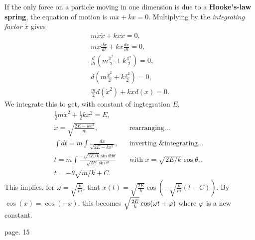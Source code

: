 \begin{remark}
    If the only force on a particle moving in one dimension is due to a \textbf{Hooke's-law spring}, the equation of motion is $m\ddot{x} + kx = 0$. Multiplying by the \emph{integrating factor} $\dot{x}$ gives 
    \begin{align*}
        m\dot{x}\ddot{x} + kx\dot{x} = 0, \\
        m\dot{x}\frac{d\dot{x}}{dt} + kx\frac{dx}{dt} = 0, \\
        \frac{d}{dt}(m\frac{\dot{x}^2}{2} + k\frac{x^2}{2}) = 0, \\
        d(m\frac{\dot{x}^2}{2} + k\frac{x^2}{2}) = 0, \\
        \frac{m}{2}d(\dot{x}^2) + kxd(x) = 0.
    \end{align*}
    We integrate this to get, with constant of ingtegration $E$,
    \begin{align*}
        \frac{1}{2}m\dot{x}^2 + \frac{1}{2}kx^2 = E, \\
        \dot{x} = \sqrt{\frac{2E - kx^2}{m}}, && \text{rearranging...} \\
        \int dt = m \int\frac{dx}{\sqrt{2E - kx^2}}, && \text{inverting \& integrating... } \\
        t = m \int\frac{-\sqrt{2E/k}\sin\theta d\theta}{\sqrt{2E}\sin\theta} && \text{with } x = \sqrt{2E/k}\cos\theta \text{...} \\
        t = -\theta\sqrt{m/k} + C.
    \end{align*}
    This implies, for $\omega = \sqrt{\frac{k}{m}}$, that $x(t) = \sqrt{\frac{2E}{k}}\cos(-\sqrt{\frac{k}{m}}(t-C))$. By $\cos(x) = \cos(-x)$, this becomes $\sqrt{\frac{2E}{k}}\cos(\omega t + \varphi)$ where $\varphi$ is a new constant.
\end{remark}
\begin{note}
    page. 15
\end{note}